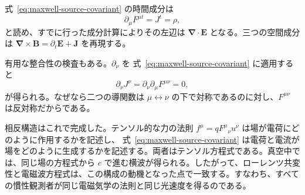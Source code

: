 式~\eqref{eq:maxwell-source-covariant} の時間成分は
\begin{equation}
\partial_\mu F^{\mu t}=J^t=\rho,
\end{equation}
と読め、すでに行った成分計算によりその左辺は
\(\boldsymbol\nabla\cdot\mathbf E\) となる。三つの空間成分は
\(\boldsymbol\nabla\times\mathbf B=\partial_t\mathbf E+\mathbf J\)
を再現する。

有用な整合性の検査もある。\(\partial_\nu\) を
式~\eqref{eq:maxwell-source-covariant} に適用すると
\begin{equation}
\partial_\nu J^\nu
=\partial_\nu\partial_\mu F^{\mu\nu}=0,
\end{equation}
が得られる。なぜなら二つの導関数は \(\mu\leftrightarrow\nu\) の下で対称であるのに対し、\(F^{\mu\nu}\) は反対称だからである。

相反構造はこれで完成した。テンソル的な力の法則
\(f^\mu=qF^\mu{}_\nu u^\nu\) は場が電荷にどのように作用するかを記述し、
式~\eqref{eq:maxwell-source-covariant} は電荷と電流が場をどのように生成するかを記述する。両者はテンソル方程式である。真空中では、同じ場の方程式から \(c\) で進む横波が得られる。したがって、ローレンツ共変性と電磁波方程式は、この構成の動機となった点で一致する。すなわち、すべての慣性観測者が同じ電磁気学の法則と同じ光速度を得るのである。